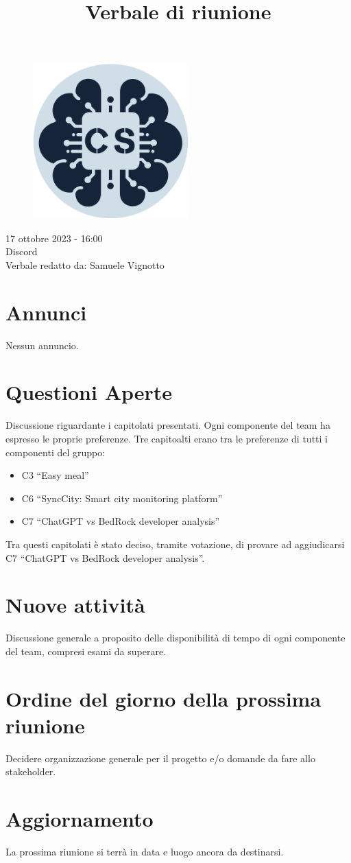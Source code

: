 \documentclass{article}
\title{\Huge{\textbf{Verbale di riunione}}\vspace{-1em}}
\date{}
\begin{document}
\maketitle
\vspace{-3em}
\begin{figure}[h]
  \centering
  \includegraphics[width=6cm, height=6cm]{documenti/logo rotondo.png}
  \label{fig:immagine}
\end{figure}

\begin{center}
\Large{17 ottobre 2023 - 16:00\\
Discord\\
Verbale redatto da: Samuele Vignotto\\}
\end{center}
\vspace{2em}
\newpage
\section{Annunci}
Nessun annuncio.
\section{Questioni Aperte}
Discussione riguardante i capitolati presentati.
Ogni componente del team ha espresso le proprie preferenze.
Tre capitoalti erano tra le preferenze di tutti i componenti del gruppo:
\begin{itemize}
\item C3 ``Easy meal''
\item C6 ``SyncCity: Smart city monitoring platform''
\item C7 ``ChatGPT vs BedRock developer analysis''
\end{itemize}
Tra questi capitolati è stato deciso, tramite votazione, di provare ad aggiudicarsi C7 ``ChatGPT vs BedRock developer analysis''.
\section{Nuove attività}
Discussione generale a proposito delle disponibilità di tempo di ogni componente del team, compresi esami da superare.
\section{Ordine del giorno della prossima riunione}
Decidere organizzazione generale per il progetto e/o domande da fare allo stakeholder.
\section{Aggiornamento}
La prossima riunione si terrà in data e luogo ancora da destinarsi.
\end{document}
